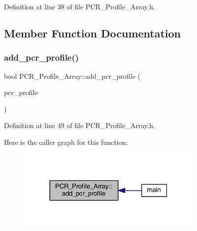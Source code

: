 Definition at line 38 of file P\+C\+R\+\_\+\+Profile\+\_\+\+Array.\+h.



\subsection{Member Function Documentation}
\mbox{\label{class_p_c_r___profile___array_a5b7ae88e5672bdc86957d8ae0ceef1b0}} 
\subsubsection{\texorpdfstring{add\+\_\+pcr\+\_\+profile()}{add\_pcr\_profile()}}
{\footnotesize\ttfamily bool P\+C\+R\+\_\+\+Profile\+\_\+\+Array\+::add\+\_\+pcr\+\_\+profile (\begin{DoxyParamCaption}\item[{\mbox{\hyperlink{class_p_c_r___profile}{P\+C\+R\+\_\+\+Profile}} $\ast$}]{pcr\+\_\+profile }\end{DoxyParamCaption})}



Definition at line 49 of file P\+C\+R\+\_\+\+Profile\+\_\+\+Array.\+h.

Here is the caller graph for this function\+:
\nopagebreak
\begin{figure}[H]
\begin{center}
\leavevmode
\includegraphics[width=258pt]{class_p_c_r___profile___array_a5b7ae88e5672bdc86957d8ae0ceef1b0_icgraph}
\end{center}
\end{figure}
\mbox{\label{class_p_c_r___profile___array_af33c2dcfeb01b3cf9516e7a9c5515004}} 
